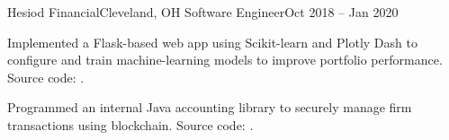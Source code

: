 \begin{ritemize}
	{Hesiod Financial}{Cleveland, OH}
	{Software Engineer}{Oct 2018 -- Jan 2020}
	\item Implemented a Flask-based web app using Scikit-learn and Plotly Dash to configure and train machine-learning models to improve portfolio performance. Source code: .
	\item Programmed an internal Java accounting library to securely manage firm transactions using blockchain. Source code: .
\end{ritemize}